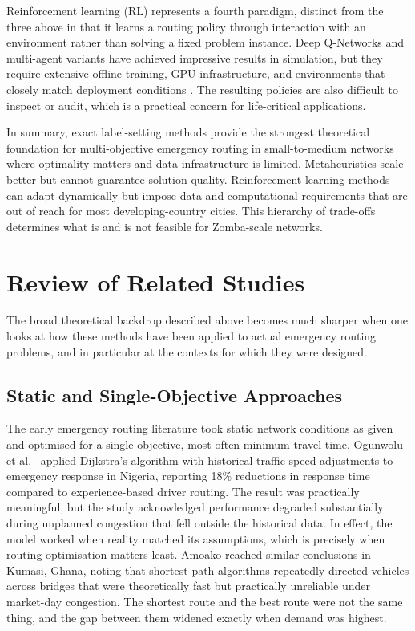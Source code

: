 \documentclass[paper=A4, 12pt, mathscr]{report}
\begin{document}
	Reinforcement learning (RL) represents a fourth paradigm, distinct from the
	three above in that it learns a routing policy through interaction with an
	environment rather than solving a fixed problem instance. Deep Q-Networks
	and multi-agent variants have achieved impressive results in simulation, but
	they require extensive offline training, GPU infrastructure, and environments
	that closely match deployment conditions \cite{yan2021, su2025}. The
	resulting policies are also difficult to inspect or audit, which is a
	practical concern for life-critical applications.
	
	In summary, exact label-setting methods provide the strongest theoretical
	foundation for multi-objective emergency routing in small-to-medium networks
	where optimality matters and data infrastructure is limited. Metaheuristics
	scale better but cannot guarantee solution quality. Reinforcement learning
	methods can adapt dynamically but impose data and computational requirements
	that are out of reach for most developing-country cities. This hierarchy of
	trade-offs determines what is and is not feasible for Zomba-scale networks.
	
	
	\section{Review of Related Studies}
	\label{sec:lit_related}
	
	The broad theoretical backdrop described above becomes much sharper when one
	looks at how these methods have been applied to actual emergency routing
	problems, and in particular at the contexts for which they were designed.
	
	\subsection*{Static and Single-Objective Approaches}
	
	The early emergency routing literature took static network conditions as
	given and optimised for a single objective, most often minimum travel time.
	Ogunwolu et al.\ \cite{15} applied Dijkstra's algorithm with historical
	traffic-speed adjustments to emergency response in Nigeria, reporting 18\%
	reductions in response time compared to experience-based driver routing.
	The result was practically meaningful, but the study acknowledged
	performance degraded substantially during unplanned congestion that fell
	outside the historical data. In effect, the model worked when reality matched
	its assumptions, which is precisely when routing optimisation matters least.
	Amoako \cite{10} reached similar conclusions in Kumasi, Ghana, noting that
	shortest-path algorithms repeatedly directed vehicles across bridges that
	were theoretically fast but practically unreliable under market-day
	congestion. The shortest route and the best route were not the same thing,
	and the gap between them widened exactly when demand was highest.
	
\end{document}
